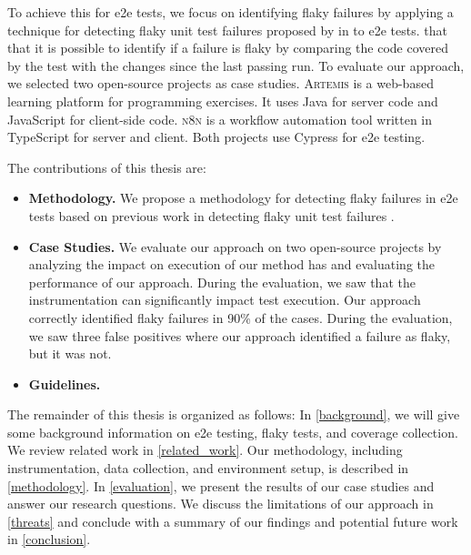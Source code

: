 To achieve this for \ac{e2e} tests, we focus on identifying flaky failures by applying a technique for detecting flaky unit test failures proposed by \citeauthor*{bell_deflaker_2018} in  \autocite{bell_deflaker_2018} to \ac{e2e} tests.
 that that it is possible to identify if a failure is flaky by comparing the code covered by the test with the changes since the last passing run. 
To evaluate our approach, we selected two open-source projects as case studies.
\textsc{Artemis} \autocite{krusche_artemis_2018} is a web-based learning platform for programming exercises.
It uses Java for server code and JavaScript for client-side code.
\textsc{n8n} \autocite{noauthor_n8n_2023} is a workflow automation tool written in TypeScript for server and client.
Both projects use Cypress \autocite{noauthor_cypress-iocypress_2023} for \ac{e2e} testing.

The contributions of this thesis are:
\begin{itemize}
	\item \textbf{Methodology.} We propose a methodology for detecting flaky failures in \ac{e2e} tests based on previous work in detecting flaky unit test failures \autocite{bell_deflaker_2018}.
	\item \textbf{Case Studies.} We evaluate our approach on two open-source projects by analyzing the impact on execution of our method has and evaluating the performance of our approach.
	      During the evaluation, we saw that the instrumentation can significantly impact test execution.
	      Our approach correctly identified flaky failures in 90\%  of the cases.
	      During the evaluation, we saw three  false positives where our approach identified a failure as flaky, but it was not.
	\item \textbf{Guidelines.} 
\end{itemize}

The remainder of this thesis is organized as follows:
In \cref{background}, we will give some background information on \ac{e2e} testing, flaky tests, and coverage collection.
We review related work in \cref{related_work}.
Our methodology, including instrumentation, data collection, and environment setup, is described in \cref{methodology}.
In \cref{evaluation}, we present the results of our case studies and answer our research questions. 
We discuss the limitations of our approach in \cref{threats} and conclude with a summary of our findings and potential future work in \cref{conclusion}.



